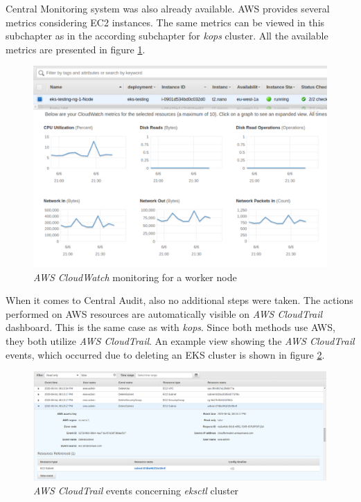 Central Monitoring system was also already available. AWS provides several metrics considering EC2 instances. The same metrics can be viewed in this subchapter as in the according subchapter for \textit{kops} cluster. All the available metrics are presented in figure \ref{eks-monitoring-ec2-node}.
\begin{figure}[H]
    \centering
    \includegraphics[width=17cm]{figures/eks-monitoring-ec2-node-small.png}
    \captionsetup{justification=centering,margin=2cm}
    \caption{\textit{AWS CloudWatch} monitoring for a worker node}
    \label{eks-monitoring-ec2-node}
\end{figure}

When it comes to Central Audit, also no additional steps were taken. The actions performed on AWS resources are automatically visible on \textit{AWS CloudTrail} dashboard. This is the same case as with \textit{kops}. Since both methods use AWS, they both utilize \textit{AWS CloudTrail}. An example view showing the \textit{AWS CloudTrail} events, which occurred due to deleting an EKS cluster is shown in figure \ref{fig:eks-ct-events}.
\begin{figure}[H]
    \centering
    \includegraphics[width=17cm]{figures/eks-ct.png}
    \captionsetup{justification=centering,margin=2cm}
    \caption{\textit{AWS CloudTrail} events concerning \textit{eksctl} cluster}
    \label{fig:eks-ct-events}
\end{figure}

